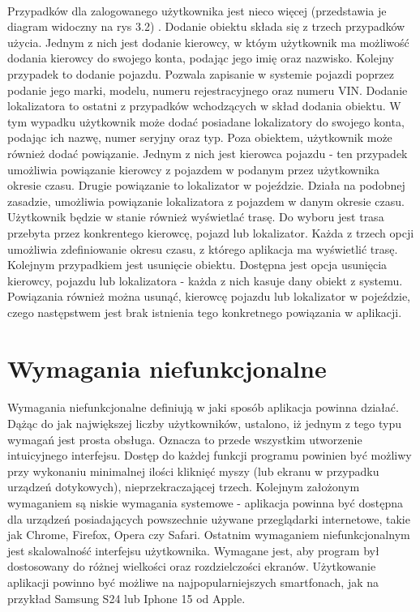 \paragraph{}
Przypadków dla zalogowanego użytkownika jest nieco więcej (przedstawia je diagram widoczny na rys 3.2) . Dodanie obiektu składa się z trzech przypadków użycia. Jednym z nich jest dodanie kierowcy, w któym użytkownik ma możliwość dodania kierowcy do swojego konta, podając jego imię oraz nazwisko. Kolejny przypadek to dodanie pojazdu. Pozwala zapisanie w systemie pojazdi poprzez podanie jego marki, modelu, numeru rejestracyjnego oraz numeru VIN. Dodanie lokalizatora to ostatni z przypadków wchodzących w skład dodania obiektu. W tym wypadku użytkownik może dodać posiadane lokalizatory do swojego konta, podając ich nazwę, numer seryjny oraz typ. Poza obiektem, użytkownik może również dodać powiązanie. Jednym z nich jest kierowca pojazdu - ten przypadek umożliwia powiązanie kierowcy z pojazdem w podanym przez użytkownika okresie czasu. Drugie powiązanie to  lokalizator w pojeździe. Działa na podobnej zasadzie, umożliwia powiązanie lokalizatora z pojazdem w danym okresie czasu. Użytkownik będzie w stanie również wyświetlać trasę. Do wyboru jest trasa przebyta przez konkrentego kierowcę, pojazd lub lokalizator. Każda z trzech opcji umożliwia zdefiniowanie okresu czasu, z którego aplikacja ma wyświetlić trasę. Kolejnym przypadkiem jest usunięcie obiektu. Dostępna jest opcja usunięcia kierowcy, pojazdu lub lokalizatora - każda z nich kasuje dany obiekt z systemu. Powiązania również można usunąć, kierowcę pojazdu lub lokalizator w pojeździe, czego następstwem jest brak istnienia tego konkretnego powiązania w aplikacji.

\section{Wymagania niefunkcjonalne}
\paragraph{}
Wymagania niefunkcjonalne definiują w jaki sposób aplikacja powinna działać. Dążąc do jak największej liczby użytkowników, ustalono, iż jednym z tego typu wymagań jest prosta obsługa. Oznacza to przede wszystkim utworzenie intuicyjnego interfejsu. Dostęp do każdej funkcji programu powinien być możliwy przy wykonaniu minimalnej ilości kliknięć myszy (lub ekranu w przypadku urządzeń dotykowych), nieprzekraczającej trzech. Kolejnym założonym wymaganiem są niskie wymagania systemowe - aplikacja powinna być dostępna dla urządzeń posiadających powszechnie używane przeglądarki internetowe, takie jak Chrome, Firefox, Opera czy Safari. Ostatnim wymaganiem niefunkcjonalnym jest skalowalność interfejsu użytkownika. Wymagane jest, aby program był dostosowany do różnej wielkości oraz rozdzielczości ekranów. Użytkowanie aplikacji powinno być możliwe na najpopularniejszych smartfonach, jak na przykład Samsung S24 lub Iphone 15 od Apple.


